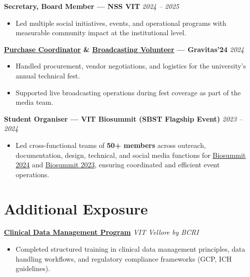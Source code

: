 \documentclass[10pt, a4paper]{article}
\newcommand{\roleentry}[2]{%
  \textbf{#1} \hfill \textit{#2}%
}
\newenvironment{rlist}{%
  \begin{itemize}[
    leftmargin=1.4em,
    itemsep=1.5pt,
    parsep=0pt,
    topsep=2pt,
    label=\textcolor{accentNavy}{\textbullet}
  ]
}{\end{itemize}}
\begin{document}
\vspace{4pt}

\roleentry{Secretary, Board Member --- NSS VIT}{2024 -- 2025}
\begin{rlist}
  \item Led multiple social initiatives, events, and operational programs with measurable community impact at the institutional level.
\end{rlist}

\vspace{4pt}

\roleentry{\href{https://drive.google.com/file/d/14N6cQ_Awc2vVhdgSZfxe_yM3ejStLzao/view?usp=sharing}{Purchase Coordinator} \& \href{https://drive.google.com/file/d/14WswTjmyprX1QEedfTjmGNNkH2UIwvdk/view?usp=sharing}{Broadcasting Volunteer} --- Gravitas'24}{2024}
\begin{rlist}
  \item Handled procurement, vendor negotiations, and logistics for the university's annual technical fest.
  \item Supported live broadcasting operations during fest coverage as part of the media team.
\end{rlist}

\vspace{4pt}

\roleentry{Student Organiser --- VIT Biosummit (SBST Flagship Event)}{2023 -- 2024}
\begin{rlist}
  \item Led cross-functional teams of \textbf{50+ members} across outreach, documentation, design, technical, and social media functions for
    \href{https://drive.google.com/file/d/13hO9CsMEPwr-QoE0crd6VkJaGHrqJp7o/view?usp=sharing}{Biosummit 2024} and
    \href{https://drive.google.com/file/d/13f9gM8je48poaUKMgv3KCLjKEBbdi4SH/view?usp=sharing}{Biosummit 2023}, ensuring coordinated and efficient event operations.
\end{rlist}

\section{Additional Exposure}

\roleentry{\href{https://drive.google.com/file/d/12W7ApoVJokFollVTmRmrdwrAF2WVF23x/view?usp=sharing}{Clinical Data Management Program}}{VIT Vellore by BCRI}
\begin{rlist}
  \item Completed structured training in clinical data management principles, data handling workflows, and regulatory compliance frameworks (GCP, ICH guidelines).
\end{rlist}
\end{document}
